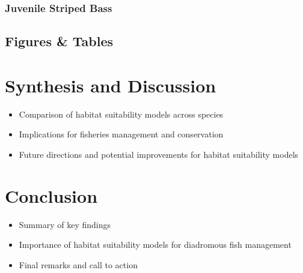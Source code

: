 \documentclass[
]{book}
\providecommand{\tightlist}{%
  \setlength{\itemsep}{0pt}\setlength{\parskip}{0pt}}
\begin{document}
\hypertarget{juvenile-striped-bass-1}{%
\subsection{Juvenile Striped Bass}\label{juvenile-striped-bass-1}}

\hypertarget{figures-tables-9}{%
\section{Figures \& Tables}\label{figures-tables-9}}

\hypertarget{synthesis-and-discussion}{%
\chapter{Synthesis and Discussion}\label{synthesis-and-discussion}}

\begin{itemize}
\tightlist
\item
  Comparison of habitat suitability models across species
\item
  Implications for fisheries management and conservation
\item
  Future directions and potential improvements for habitat suitability models
\end{itemize}

\hypertarget{conclusion}{%
\chapter{Conclusion}\label{conclusion}}

\begin{itemize}
\tightlist
\item
  Summary of key findings
\item
  Importance of habitat suitability models for diadromous fish management
\item
  Final remarks and call to action
\end{itemize}

  
\end{document}
